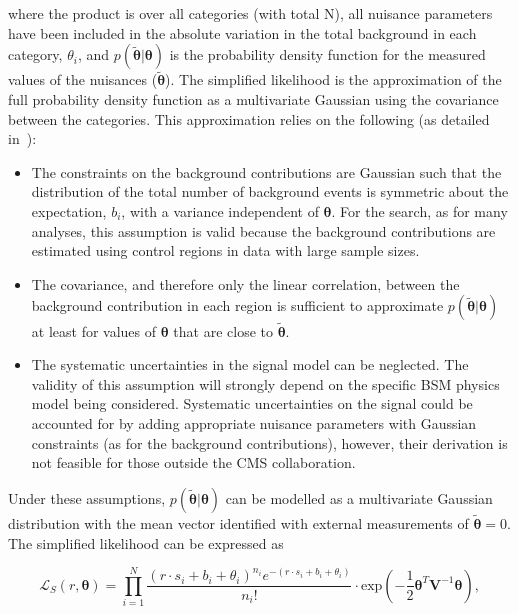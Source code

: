 \noindent where the product is over all categories (with total N), all nuisance parameters
have been included in the absolute variation in the total background in each category, $\theta_i$, and
$p(\tilde{\boldsymbol{\theta}}|\boldsymbol{\theta})$ is the probability density function for the measured 
values of the nuisances ($\tilde{\boldsymbol{\theta}}$). 
The simplified likelihood is the approximation of the full probability density function 
as a multivariate Gaussian using the covariance between the categories.
This approximation relies on the following (as detailed in~\cite{simp-lik}):
\begin{itemize}
\item{The constraints on the background contributions are Gaussian such that the distribution of 
the total number of background events is symmetric about the expectation, $b_{i}$, 
with a variance independent of $\boldsymbol{\theta}$. For the \alphat search, as for many analyses, 
this assumption is valid because the background contributions are estimated using control regions in 
data with large sample sizes.}

\item{The covariance, and therefore only the linear correlation, 
between the background contribution in each region is sufficient 
to approximate $p(\tilde{\boldsymbol{\theta}}|\boldsymbol{\theta})$ 
at least for values of $\boldsymbol{\theta}$ that are close to $\tilde{\boldsymbol{\theta}}$.}

\item{The systematic uncertainties in the signal model can be neglected. The validity of 
this assumption will strongly depend on the specific BSM physics model being considered. 
Systematic uncertainties on the signal could be accounted for by adding appropriate 
nuisance parameters with Gaussian constraints (as for the background contributions), however,
their derivation is not feasible for those outside the CMS collaboration.} 
\end{itemize}

Under these assumptions, $p(\tilde{\boldsymbol{\theta}}|\boldsymbol{\theta})$ can be modelled as a multivariate 
Gaussian distribution with the mean vector identified with external measurements of 
$\tilde{\boldsymbol{\theta}}=0$. The simplified likelihood can be expressed as

\begin{equation}
\mathcal{L}_{S}(r, \boldsymbol{\theta}) =  \prod_{i=1}^{N} \dfrac{(r \cdot s_{i}+b_{i}+\theta_{i})^{n_{i}} e^{-(r \cdot s_{i}+b_{i}+\theta_{i})} }{n_{i}!} \cdot  
\mathrm{exp}\left(-\dfrac{1}{2} \boldsymbol{\theta}^{T}\mathrm{\mathbf{V}}^{-1}\boldsymbol{\theta} \right),
\label{eq:full-likelihood}
\end{equation}

